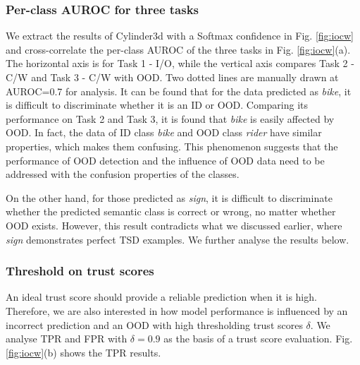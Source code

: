 \documentclass[journal]{IEEEtran}
\begin{document}
\subsubsection{Per-class AUROC for three tasks}

We extract the results of Cylinder3d with a Softmax confidence in Fig. \ref{fig:iocw} and cross-correlate the per-class AUROC of the three tasks in Fig. \ref{fig:iocw}(a).
The horizontal axis is for Task 1 - I/O, while the vertical axis compares Task 2 - C/W and Task 3 - C/W with OOD.
Two dotted lines are manually drawn at AUROC=0.7 for analysis. It can be found that for the data predicted as \textit{bike}, it is difficult to discriminate whether it is an ID or OOD. Comparing its performance on Task 2 and Task 3, it is found that \textit{bike} is easily affected by OOD.
In fact, the data of ID class \textit{bike} and OOD class \textit{rider} have similar properties, which makes them confusing.
This phenomenon suggests that the performance of OOD detection and the influence of OOD data need to be addressed with the confusion properties of the classes.

On the other hand, for those predicted as \textit{sign}, it is difficult to discriminate whether the predicted semantic class is correct or wrong, no matter whether OOD exists.
However, this result contradicts what we discussed earlier, where \textit{sign} demonstrates perfect TSD examples. We further analyse the results below.

\subsubsection{Threshold on trust scores}



An ideal trust score should provide a reliable prediction when it is high. Therefore, we are also interested in how model performance is influenced by an incorrect prediction and an OOD with high thresholding trust scores $\delta$. We analyse TPR and FPR with $\delta=0.9$ as the basis of a trust score evaluation.
Fig. \ref{fig:iocw}(b) shows the TPR results.
\end{document}

